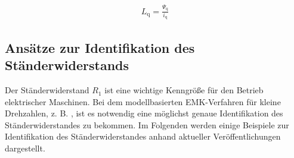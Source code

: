\documentclass[conference,twocolumn]{IEEEtran}
\newcommand{\x}[1]{\mathrm{#1}}
\begin{document}
\begin{align}
L_\x{q} = \frac{\Psi_\x{q}}{i_\x{q}}
\end{align}







\subsection{Ansätze zur Identifikation des Ständerwiderstands}\label{sec:stator-ident}

Der Ständerwiderstand $R_\x{1}$ ist eine wichtige Kenngröße für den Betrieb elektrischer Maschinen.
Bei dem modellbasierten EMK-Verfahren für kleine Drehzahlen, z. B. \autocite{genduso}, ist es notwendig eine möglichst genaue Identifikation des Ständerwiderstandes zu bekommen.
Im Folgenden werden einige Beispiele zur Identifikation des Ständerwiderstandes anhand aktueller Veröffentlichungen dargestellt.
\end{document}
